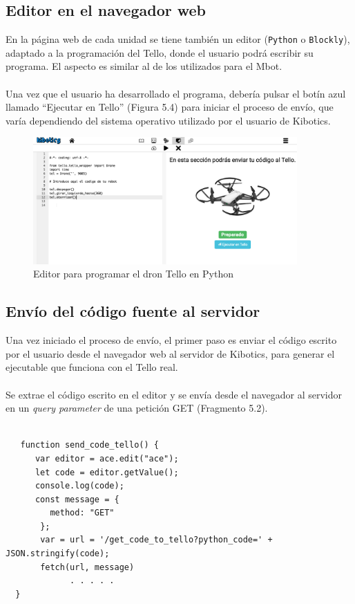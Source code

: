 \documentclass{report}
\begin{document}
\subsection{Editor en el navegador web}

En la página web de cada unidad se tiene también un editor (\texttt{Python} o \texttt{Blockly}), adaptado a la programación del Tello, donde el usuario podrá escribir su programa. El aspecto es similar al de los utilizados para el Mbot. 
\\
\\
Una vez que el usuario ha desarrollado el programa, debería pulsar el botín azul llamado “Ejecutar en Tello” (Figura 5.4) para iniciar el proceso de envío, que varía dependiendo del sistema operativo utilizado por el usuario de Kibotics.
\\
\begin{figure}[h!]
  \centering
    \includegraphics[width=0.9\textwidth]{images/editor_tello.png}
  \caption{Editor para programar el dron Tello en Python}
  \label{Editor para programar el dron Tello en Python}
\end{figure}


\subsection{Envío del código fuente al servidor}

Una vez iniciado el proceso de envío, el primer paso es enviar el código escrito por el usuario desde el navegador web al servidor de Kibotics, para generar el ejecutable que funciona con el Tello real. 
\\
\\
Se extrae el código escrito en el editor y se envía desde el navegador al servidor en un \textit{query parameter} de una petición GET (Fragmento 5.2).
\\
\begin{lstlisting}[frame=single,breaklines=true, label=Envío del programa desde el navegador al servidor", caption=Envío del programa desde el navegador al servidor,captionpos=b]
   
   function send_code_tello() {
      var editor = ace.edit("ace");
      let code = editor.getValue();
      console.log(code);
      const message = {
         method: "GET"
       };
       var = url = '/get_code_to_tello?python_code=' + JSON.stringify(code);
       fetch(url, message)
             . . . . .
  }
\end{lstlisting}
\end{document}

